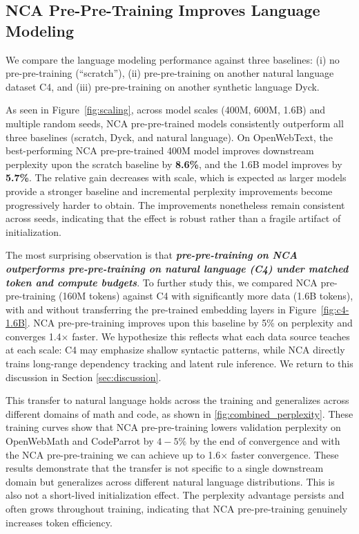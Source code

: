 \documentclass{article}
\theoremstyle{plain}
\theoremstyle{definition}
\theoremstyle{remark}
\begin{document}
\subsection{NCA Pre-Pre-Training Improves Language Modeling}
\label{subsec:nca_transfer}

We compare the language modeling performance against three baselines: (i) no pre-pre-training (``scratch''), (ii) pre-pre-training on another natural language dataset C4, and (iii) pre-pre-training on another synthetic language Dyck. 

As seen in Figure~\ref{fig:scaling}, across model scales (400M, 600M, 1.6B) and multiple random seeds, NCA pre-pre-trained models consistently outperform all three baselines (scratch, Dyck, and natural language). On OpenWebText, the best-performing NCA pre-pre-trained 400M model improves downstream perplexity upon the scratch baseline by \textbf{8.6\%}, and the 1.6B model improves by  \textbf{5.7\%}. The relative gain decreases with scale, which is expected as larger models provide a stronger baseline and incremental perplexity improvements become progressively harder to obtain. The improvements nonetheless remain consistent across seeds, indicating that the effect is robust rather than a fragile artifact of initialization.

The most surprising observation is that \textbf{\textit{pre-pre-training on NCA outperforms pre-pre-training on natural language (C4) under matched token and compute budgets}}. To further study this, we compared NCA pre-pre-training (160M tokens) against C4 with significantly more data (1.6B tokens), with and without transferring the pre-trained embedding layers in Figure~\ref{fig:c4-1.6B}. NCA pre-pre-training improves upon this baseline by 5\% on perplexity and converges 1.4$\times$ faster. We hypothesize this reflects what each data source teaches at each scale: C4 may emphasize shallow syntactic patterns, while NCA directly trains long-range dependency tracking and latent rule inference. We return to this discussion in Section \ref{sec:discussion}.

This transfer to natural language holds across the training and generalizes across different domains of math and code, as shown in \cref{fig:combined_perplexity}. These training curves show that NCA pre-pre-training lowers validation perplexity on OpenWebMath and CodeParrot by $4-5\%$ by the end of convergence and with the NCA pre-pre-training we can achieve up to 1.6$\times$ faster convergence. These results demonstrate that the transfer is not specific to a single downstream domain but generalizes across different natural language distributions. This is also not a short-lived initialization effect. The perplexity advantage persists and often grows throughout training, indicating that NCA pre-pre-training genuinely increases token efficiency.
\end{document}
